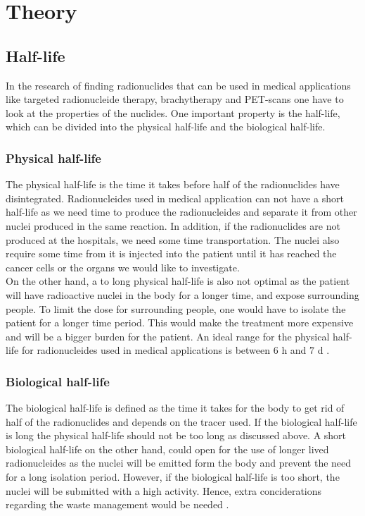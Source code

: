 \chapter{Theory}
\label{theory}
\section{Half-life}
In the research of finding radionuclides that can be used in medical applications like targeted radionucleide therapy, brachytherapy and PET-scans one have to look at the properties of the nuclides. One important property is the half-life, which can be divided into the physical half-life and the biological half-life. 

\subsection{Physical half-life}
The physical half-life is the time it takes before half of the radionuclides have disintegrated. Radionucleides used in medical application can not have a short half-life as we need time to produce the radionucleides and separate it from other nuclei produced in the same reaction. In addition, if the radionuclides are not produced at the hospitals, we need some time transportation. The nuclei also require some time from it is injected into the patient until it has reached the cancer cells or the organs we would like to investigate. 
\vspace{3mm}
\\
On the other hand, a to long physical half-life is also not optimal as the patient will have radioactive nuclei in the body for a longer time, and expose surrounding people. To limit the dose for surrounding people, one would have to isolate the patient for a longer time period. This would make the treatment more expensive and will be a bigger burden for the patient. An ideal range for the physical half-life for radionucleides used in medical applications is between $6$ h and $7$ d \cite{yeongTherapeuticRadionuclidesNuclear2014a}.

\subsection{Biological half-life}
The biological half-life is defined as the time it takes for the body to get rid of half of the radionuclides and depends on the tracer used. If the biological half-life is long the physical half-life should not be too long as discussed above. A short biological half-life on the other hand, could open for the use of longer lived radionucleides as the nuclei will be emitted form the body and prevent the need for a long isolation period. However, if the biological half-life is too short, the nuclei will be submitted with a high activity. Hence, extra conciderations regarding the waste management would be needed \cite{yeongTherapeuticRadionuclidesNuclear2014a}.




